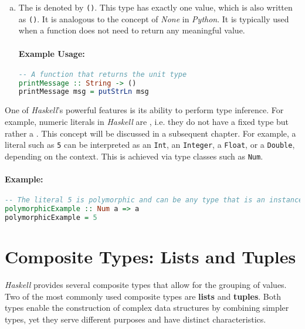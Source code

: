 \begin{enumerate}[(a)]
\item The  is denoted by \texttt{()}.  This type has exactly one value, which is also written
  as \texttt{()}.  It is analogous to the concept of \textit{None} in \textsl{Python}. It is typically used
  when a function does not need to return any  meaningful value. 

\paragraph{Example Usage:}
\begin{lstlisting}[style=haskellstyle, language=Haskell]
-- A function that returns the unit type
printMessage :: String -> ()
printMessage msg = putStrLn msg
\end{lstlisting}
\end{enumerate}

\noindent
One of \textsl{Haskell}’s powerful features is its ability to perform type inference. For example, numeric literals in
\textsl{Haskell} are , i.e. they do not have a fixed type but rather a .  This
concept will be discussed in a subsequent chapter.  For example, a literal such as \texttt{5} can be
interpreted as an \texttt{Int}, an \texttt{Integer}, a \texttt{Float}, or a \texttt{Double}, depending on the
context. This is achieved via type classes such as \texttt{Num}. 

\paragraph{Example:}
\begin{lstlisting}[style=haskellstyle, language=Haskell]
-- The literal 5 is polymorphic and can be any type that is an instance of Num.
polymorphicExample :: Num a => a
polymorphicExample = 5
\end{lstlisting}

\section{Composite Types: Lists and Tuples}

\textsl{Haskell} provides several composite types that allow for the grouping of values. Two of the most commonly used
composite types are \textbf{lists} and \textbf{tuples}. Both types enable the construction of complex data
structures by combining simpler types, yet they serve different purposes and have distinct characteristics. 

